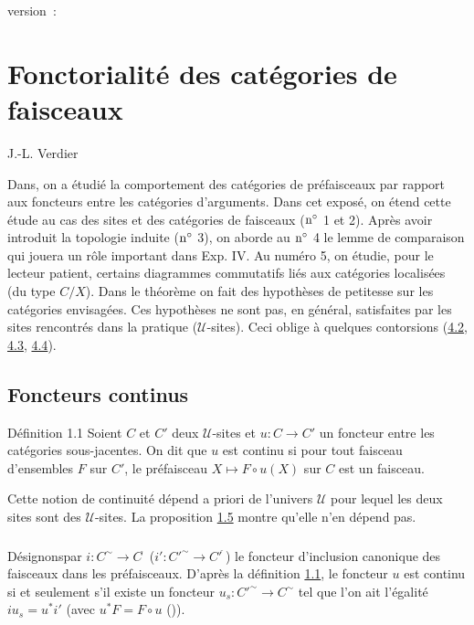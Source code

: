 version : \showgitstatus{}
\tableofcontents

\else
\chapter{Fonctorialité des catégories de faisceaux}
\begin{center}
J.-L. Verdier
\end{center}
\fi

Dans\pageoriginale {}, on a étudié la comportement des catégories de
préfaisceaux par rapport aux foncteurs entre les catégories
d'arguments. Dans cet exposé, on étend cette étude au cas des sites
et des catégories de faisceaux (${\rm n^{\circ}}$ 1 et 2). Après
avoir introduit la topologie induite (${\rm n^{\circ}}$ 3), on
aborde au ${\rm n^{\circ}}$ 4 le lemme de comparaison qui jouera un
rôle important dans Exp. IV. Au numéro 5, on étudie, pour le
lecteur patient, certains diagrammes commutatifs liés aux catégories
localisées (du type $C/X$). Dans le théorème  on fait
des hypothèses de petitesse sur les catégories envisagées. Ces
hypothèses ne sont pas, en général, satisfaites par les sites
rencontrés dans la pratique ($𝒰$-sites). Ceci oblige à
quelques contorsions (\hyperref[III.subsec4.2]{4.2}, \hyperref[III.subsec4.3]{4.3},
\hyperref[III.subsec4.4]{4.4}).

\section{Foncteurs continus}

\begin{enonce*}{Définition 1.1}
Soient $C$ et $C'$ deux $𝒰$-sites et $u:C\rightarrow C'$ un
foncteur entre les catégories sous-jacentes. On dit que $u$ est
continu si pour tout faisceau d'ensembles $F$ sur $C'$, le
préfaisceau $X\mapsto F\circ u(X)$ sur $C$ est un faisceau.
\end{enonce*}

Cette notion de continuité dépend a priori de l'univers
$𝒰$ pour lequel les deux sites sont des $𝒰$-sites.
La proposition \hyperref[III.prop1.5]{1.5} montre qu'elle n'en dépend pas.

\setcounter{subsection}{10}
\subsection{}
Désignons\pageoriginale par $i:C^{\sim}\rightarrow
C^{\widehat{\phantom{,}}}$ (\resp $i':{C'}^{\sim}\rightarrow
{C'}^{\widehat{\phantom{,}}}$) le foncteur d'inclusion canonique des
faisceaux dans les préfaisceaux. D'après la définition
\hyperref[III.def1.1]{1.1}, le foncteur $u$ est continu si et seulement s'il
existe un foncteur $u_s:{C'}^{\sim}\rightarrow C^{\sim}$ tel que
l'on ait l'égalité $iu_s=u^\ast i'$ (avec $u^\ast F=F\circ
u$ ()).

